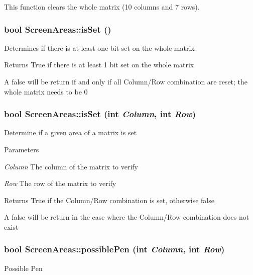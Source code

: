 This function clears the whole matrix (10 columns and 7 rows). \hypertarget{classScreenAreas_af4849b1671e82943c581e4195a56d9cf}{
\subsubsection[{isSet}]{\setlength{\rightskip}{0pt plus 5cm}bool ScreenAreas::isSet ()}}
\label{classScreenAreas_af4849b1671e82943c581e4195a56d9cf}
Determines if there is at least one bit set on the whole matrix

\begin{DoxyReturn}{Returns}
True if there is at least 1 bit set on the whole matrix
\end{DoxyReturn}
A false will be return if and only if all Column/Row combination are reset; the whole matrix needs to be 0 \hypertarget{classScreenAreas_a444f27e1596fec9e690039c3e713a06d}{
\subsubsection[{isSet}]{\setlength{\rightskip}{0pt plus 5cm}bool ScreenAreas::isSet (int {\em Column}, \/  int {\em Row})}}
\label{classScreenAreas_a444f27e1596fec9e690039c3e713a06d}
Determine if a given area of a matrix is set 
\begin{DoxyParams}{Parameters}
\item[{\em Column}]The column of the matrix to verify \item[{\em Row}]The row of the matrix to verify\end{DoxyParams}
\begin{DoxyReturn}{Returns}
True if the Column/Row combination is set, otherwise false
\end{DoxyReturn}
A false will be return in the case where the Column/Row combination does not exist \hypertarget{classScreenAreas_a347743e216f48b68b3893744d03747ff}{
\subsubsection[{possiblePen}]{\setlength{\rightskip}{0pt plus 5cm}bool ScreenAreas::possiblePen (int {\em Column}, \/  int {\em Row})}}
\label{classScreenAreas_a347743e216f48b68b3893744d03747ff}
Possible Pen


